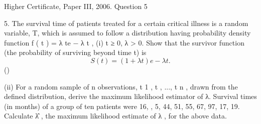 \documentclass[a4paper,12pt]{article}
\begin{document}
Higher Certificate, Paper III, 2006. Question 5
\begin{framed}
5.
The survival time of patients treated for a certain critical illness is a random variable,
T, which is assumed to follow a distribution having probability density function
f ( t ) = λ  te − λ t ,
(i)
t ≥ 0,
λ > 0.
Show that the survivor function (the probability of surviving beyond time t) is
\[S ( t ) = (1 + λ t ) e − λ t .\]
()

(ii)
For a random sample of n observations, t 1 , t  , ..., t n , drawn from the defined
distribution, derive the maximum likelihood estimator of λ.
Survival times (in months) of a group of ten patients were
16, , 5, 44, 51, 55, 67, 97, 17, 19.
Calculate λ̂ , the maximum likelihood estimate of λ , for the above data.
\end{framed}
\end{document}
